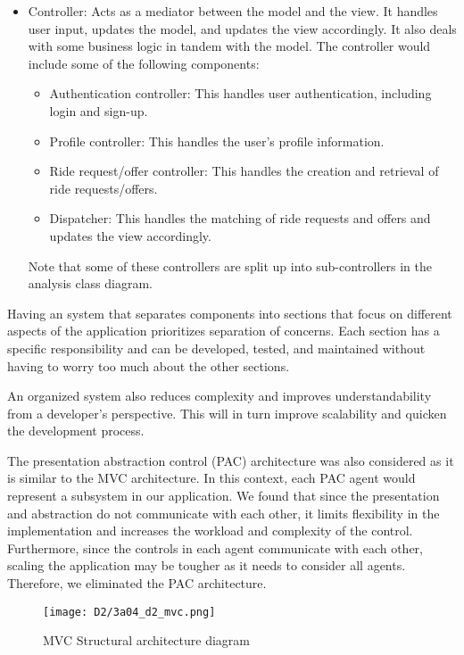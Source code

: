 \documentclass[]{article}
\begin{document}
\begin{itemize}
\begin{itemize}
    \end{itemize}
    \item Controller: Acts as a mediator between the model and the view. It handles user input, updates the model, and updates the view accordingly. It also deals with some business logic in tandem with the model. The controller would include some of the following components:
    \begin{itemize}
        \item Authentication controller: This handles user authentication, including login and sign-up.
        \item Profile controller: This handles the user's profile information.
        \item Ride request/offer controller: This handles the creation and retrieval of ride requests/offers.
        \item Dispatcher: This handles the matching of ride requests and offers and updates the view accordingly.
    \end{itemize}
    Note that some of these controllers are split up into sub-controllers in the analysis class diagram.
\end{itemize}

Having an system that separates components into sections that focus on different aspects of the application prioritizes separation of concerns. Each section has a specific responsibility and can be developed, tested, and maintained without having to worry too much about the other sections. 

An organized system also reduces complexity and improves understandability from a developer's perspective. This will in turn improve scalability and quicken the development process.

The presentation abstraction control (PAC) architecture was also considered as it is similar to the MVC architecture. In this context, each PAC agent would represent a subsystem in our application. We found that since the presentation and abstraction do not communicate with each other, it limits flexibility in the implementation and increases the workload and complexity of the control. Furthermore, since the controls in each agent communicate with each other, scaling the application may be tougher as it needs to consider all agents. Therefore, we eliminated the PAC architecture.


\begin{figure}[h]
	\centering
	\texttt{[image: D2/3a04\_d2\_mvc.png]}
	\caption{MVC Structural architecture diagram}
	\label{fig:acd}
\end{figure}
\end{document}
